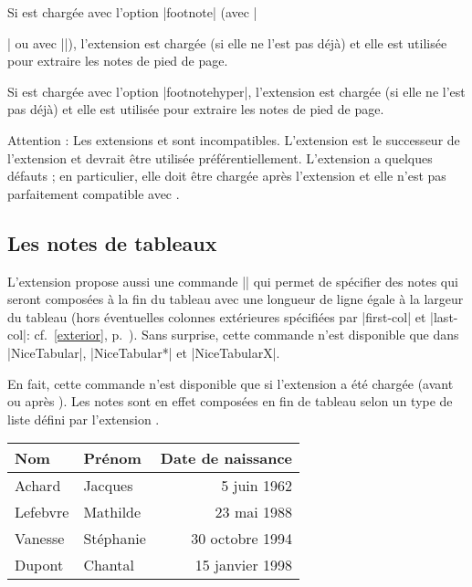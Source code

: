 \documentclass[dvipsnames]{article}%
\begin{document}
\smallskip
Si  est chargée avec l'option |footnote| (avec
|\usepackage[footnote]{nicematrix}| ou avec |\PassOptionsToPackage|),
l'extension  est chargée (si elle ne l'est pas déjà) et elle est
utilisée pour extraire les notes de pied de page.

\smallskip
Si  est chargée avec l'option |footnotehyper|, l'extension
 est chargée (si elle ne l'est pas déjà) et elle est utilisée
pour extraire les notes de pied de page.

\smallskip
Attention : Les extensions  et  sont
incompatibles. L'extension  est le successeur de l'extension
 et devrait être utilisée préférentiellement. L'extension
 a quelques défauts ; en particulier, elle doit être chargée après
l'extension  et elle n'est pas parfaitement compatible avec
.



\subsection{Les notes de tableaux}
\label{tabularnote}

L'extension  propose aussi une commande |\tabularnote| qui
permet de spécifier des notes qui seront composées à la fin du tableau avec une
longueur de ligne égale à la largeur du tableau (hors éventuelles colonnes
extérieures spécifiées par |first-col| et |last-col|: cf.~\ref{exterior},
p.~\pageref{exterior}). Sans surprise, cette commande n'est disponible que dans
|{NiceTabular}|, |{NiceTabular*}| et |{NiceTabularX}|.


En fait, cette commande n'est disponible que si l'extension  a été
chargée (avant ou après ). Les notes sont en effet composées en
fin de tableau selon un type de liste défini par l'extension .

\medskip
\begin{Code}
\begin{NiceTabular}{@{}llr@{}}
\toprule \RowStyle{\bfseries}
Nom & Prénom & Date de naissance \\
\midrule
Achard\emph{}
& Jacques & 5 juin 1962 \\
Lefebvre\emph{}
& Mathilde & 23 mai 1988 \\
Vanesse & Stéphanie & 30 octobre 1994 \\
Dupont & Chantal & 15 janvier 1998 \\
\bottomrule
\end{NiceTabular}
\end{Code}
\end{document}
